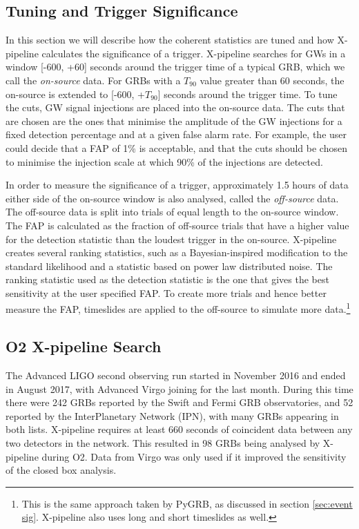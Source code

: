 \documentclass[11pt]{cuthesis}
\newcommand{\xp}{X-pipeline }
\begin{document}
\subsection{Tuning and Trigger Significance}
In this section we will describe how the coherent statistics are tuned and how \xp calculates the significance of a trigger. \xp searches for GWs in a window  [-600, +60] seconds around the trigger time of a typical GRB, which we call the \textit{on-source} data. For GRBs with a $T_{90}$ value greater than 60 seconds, the on-source is extended to [-600, +$T_{90}$] seconds around the trigger time. To tune the cuts, GW signal injections are placed into the on-source data. The cuts that are chosen are the ones that minimise the amplitude of the GW injections for a fixed detection percentage and at a given false alarm rate. For example, the user could decide that a FAP of 1\% is acceptable, and that the cuts should be chosen to minimise the injection scale at which 90\% of the injections are detected.   

In order to measure the significance of a trigger, approximately 1.5 hours of data either side of the on-source window is also analysed, called the \textit{off-source} data. The off-source data is split into trials of equal length to the on-source window. The FAP is calculated as the fraction of off-source trials that have a higher value for the detection statistic than the loudest trigger in the on-source. \xp creates several ranking statistics, such as a Bayesian-inspired modification to the standard likelihood \cite{was_xpipeline} and a statistic based on power law distributed noise. \cite{was-thesis} The ranking statistic used as the detection statistic is the one that gives the best sensitivity at the user specified FAP. To create more trials and hence better measure the FAP, timeslides are applied to the off-source to simulate more data.\footnote{This is the same approach taken by PyGRB, as discussed in section \ref{sec:event sig}. \xp also uses long and short timeslides as well.} 

\subsection{O2 \xp Search} \label{sec:xp o2 results}
The Advanced LIGO second observing run started in November 2016 and ended in August 2017, with Advanced Virgo joining for the last month. During this time there were 242 GRBs reported by the Swift and Fermi GRB observatories, and 52 reported by the InterPlanetary Network (IPN), with many GRBs appearing in both lists. \xp requires at least 660 seconds of coincident data between any two detectors in the network. This resulted in 98 GRBs being analysed by \xp during O2. Data from Virgo was only used if it improved the sensitivity of the closed box analysis. 
\end{document}
